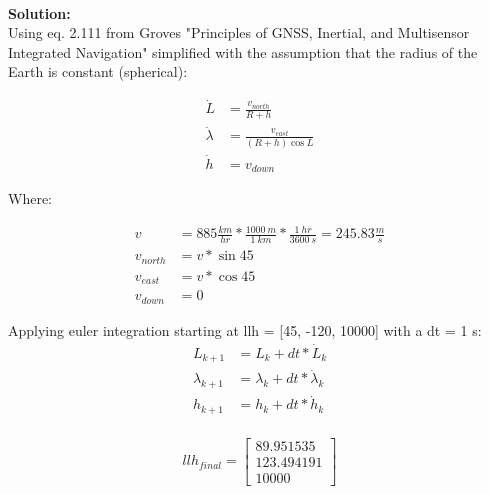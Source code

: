 \documentclass[12pt]{article}
\newcommand{\solution}{\textbf{\\Solution: \\}}
\begin{document}
  \begin{adjustwidth}{10mm}{0mm}
    \solution
    Using eq. 2.111 from Groves "Principles of GNSS, Inertial, and Multisensor 
    Integrated Navigation" simplified with the assumption that the radius of the 
    Earth is constant (spherical):

    \begin{equation}
      \begin{split}
        \dot{L} &= \frac{v_{north}}{R+h} \\
        \dot{\lambda} &= \frac{v_{east}}{(R+h)\cos{L}} \\
        \dot{h} &= v_{down}
      \end{split}
    \end{equation}

    Where:

    \begin{equation}
      \begin{split}
        v &= 885 \frac{\si{km}}{\si{hr}} * \frac{1000 \:\si{m}}{1 \:\si{km}} *
                      \frac{1 \:\si{hr}}{3600 \:\si{s}} = 245.83 \frac{\si{m}}{\si{s}}\\
        v_{north} &= v * \sin{45} \\
        v_{east} &= v * \cos{45} \\
        v_{down} &= 0
      \end{split}
    \end{equation}

    Applying euler integration starting at llh = [45, -120, 10000] with a 
    dt = 1 s: \\
    \begin{equation}
      \begin{split}
        L_{k+1} &= L_{k} + dt*\dot{L}_{k} \\
        \lambda_{k+1} &= \lambda_{k} + dt*\dot{\lambda}_{k} \\
        h_{k+1} &= h_{k} + dt*\dot{h}_{k} \\
      \end{split}
    \end{equation}

    \begin{equation}
      llh_{final} = \begin{bmatrix}
        89.951535 \\[2pt] 123.494191 \\[2pt] 10000
      \end{bmatrix}
    \end{equation}


\end{adjustwidth}
\end{document}
